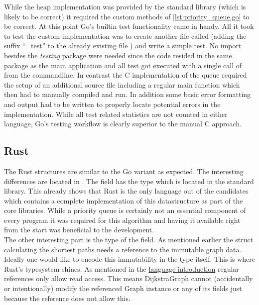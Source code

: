 While the heap implementation was provided by the standard library (which is likely to be correct) it required the custom methods of \autoref{lst:priority_queue.go} to be correct. At this point Go's builtin test functionality came in handy. All it took to test the custom implementation was to create another file called  (adding the suffix ``\_test'' to the already existing file ) and write a simple test. No import besides the \textit{testing} package were needed since the code resided in the same package as the main application and all test got executed with a single call of  from the commandline. In contrast the C implementation of the queue required the setup of an additional source file including a regular main function which then had to manually compiled and run. In addition some basic error formatting and output had to be written to properly locate potential errors in the implementation. While all test related statistics are not counted in either language, Go's testing workflow is clearly superior to the manual C approach.

\subsection{Rust}
\label{subsec:Implementation::Graph_Representation::Rust}

The Rust structures are similar to the Go variant as expected. The interesting differences are located in . The  field has the type  which is located in the standard library. This already shows that Rust is the only language out of the candidates which contains a complete implementation of this datastructure as part of the core libraries. While a priority queue is certainly not an essential component of every program it was required for this algorithm and having it available right from the start was beneficial to the development.
\\


The other interesting part is the type of the  field. As mentioned earlier the struct calculating the shortest paths needs a reference to the immutable graph data. Ideally one would like to encode this immutability in the type itself. This is where Rust's typesystem shines. As mentioned in the \hyperref[subsec:State_of_the_art::Candidates::Rust]{language introduction} regular references only allow read access. This means DijkstraGraph cannot (accidentally or intentionally) modify the referenced Graph instance or any of its fields just because the reference does not allow this.

